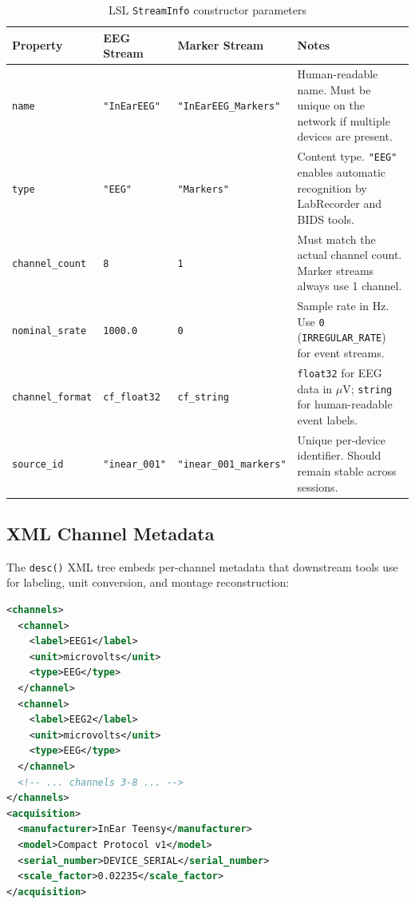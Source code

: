 \documentclass[11pt,a4paper]{article}
\begin{document}
\begin{table}[H]
\centering
\caption{LSL \texttt{StreamInfo} constructor parameters}
\label{tab:lsl-streaminfo}
\small
\begin{tabularx}{\textwidth}{|l|l|l|>{\raggedright\arraybackslash}X|}
\hline
\textbf{Property} & \textbf{EEG Stream} & \textbf{Marker Stream} & \textbf{Notes} \\\hline
\hline
\texttt{name} &
\texttt{"InEarEEG"} &
\texttt{"InEarEEG\_Markers"} &
Human-readable name.  Must be unique on the network if multiple devices are present. \\
\hline
\texttt{type} &
\texttt{"EEG"} &
\texttt{"Markers"} &
Content type.  \texttt{"EEG"} enables automatic recognition by LabRecorder and BIDS tools. \\
\hline
\texttt{channel\_count} &
\texttt{8} &
\texttt{1} &
Must match the actual channel count.  Marker streams always use 1 channel. \\
\hline
\texttt{nominal\_srate} &
\texttt{1000.0} &
\texttt{0} &
Sample rate in Hz.  Use \texttt{0} (\texttt{IRREGULAR\_RATE}) for event streams. \\
\hline
\texttt{channel\_format} &
\texttt{cf\_float32} &
\texttt{cf\_string} &
\texttt{float32} for EEG data in $\mu$V; \texttt{string} for human-readable event labels. \\
\hline
\texttt{source\_id} &
\texttt{"inear\_001"} &
\texttt{"inear\_001\_markers"} &
Unique per-device identifier.  Should remain stable across sessions. \\
\hline
\end{tabularx}
\end{table}

\subsection{XML Channel Metadata}

The \texttt{desc()} XML tree embeds per-channel metadata that downstream tools use for labeling, unit conversion, and montage reconstruction:

\begin{lstlisting}[style=code, language=XML, caption={Recommended LSL XML metadata for EEG stream}]
<channels>
  <channel>
    <label>EEG1</label>
    <unit>microvolts</unit>
    <type>EEG</type>
  </channel>
  <channel>
    <label>EEG2</label>
    <unit>microvolts</unit>
    <type>EEG</type>
  </channel>
  <!-- ... channels 3-8 ... -->
</channels>
<acquisition>
  <manufacturer>InEar Teensy</manufacturer>
  <model>Compact Protocol v1</model>
  <serial_number>DEVICE_SERIAL</serial_number>
  <scale_factor>0.02235</scale_factor>
</acquisition>
\end{lstlisting}
\end{document}

